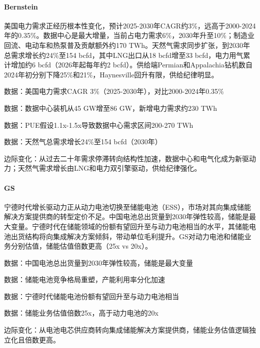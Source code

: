\documentclass[11pt]{ctexart}
\begin{document}
\paragraph{Bernstein} 美国电力需求正经历根本性变化，预计2025-2030年CAGR约3\%，远高于2000-2024年的0.35\%。数据中心是最大增量，当前占电力需求6\%，2030年升至10\%；制造业回流、电动车和热泵普及贡献额外约170 TWh。天然气需求同步扩张，到2030年总需求增长约24\%至154 bcfd，其中LNG出口从18 bcfd增至33 bcfd，电力用气累计增加约6 bcfd（2026年起每年约2 bcfd）。供给端Permian和Appalachia钻机数自2024年初分别下降25\%和21\%，Haynesville回升有限，供给纪律明显。
{\small\color{refgray}数据：美国电力需求CAGR 3\%（2025-2030年），对比2000-2024年0.35\%\par}
{\small\color{refgray}数据：数据中心装机从45 GW增至86 GW，新增电力需求约230 TWh\par}
{\small\color{refgray}数据：PUE假设1.1x-1.5x导致数据中心需求区间200-270 TWh\par}
{\small\color{refgray}数据：天然气总需求增长24\%至154 bcfd（2030年）\par}
{\small\color{refgray}边际变化：从过去二十年需求停滞转向结构性加速，数据中心和电气化成为新驱动力；天然气需求增长由LNG和电力双引擎驱动，供给纪律强化。\par}
\paragraph{GS} 宁德时代增长驱动力正从动力电池切换至储能电池（ESS），市场对其向集成储能解决方案提供商的转型定价不足。中国电池总出货量到2030年弹性较高，储能是最大变量。宁德时代在储能领域的份额有望回升至与动力电池相当的水平，其储能电池出货结构将向集成解决方案倾斜，带动单位毛利提升。GS对动力电池和储能业务分别估值，储能估值倍数更高（25x vs 20x）。
{\small\color{refgray}数据：中国电池总出货量到2030年弹性较高，储能是最大变量\par}
{\small\color{refgray}数据：储能电池竞争格局重塑，产能利用率分化加速\par}
{\small\color{refgray}数据：宁德时代储能电池份额有望回升至与动力电池相当\par}
{\small\color{refgray}数据：储能业务估值倍数25x，高于动力电池的20x\par}
{\small\color{refgray}边际变化：从电池电芯供应商转向集成储能解决方案提供商，储能业务估值逻辑独立化且倍数更高。\par}
\end{document}
